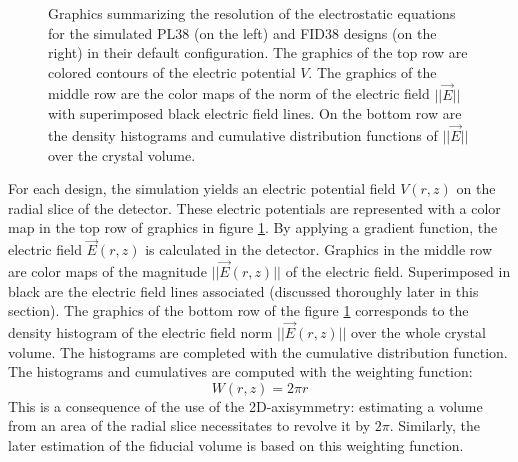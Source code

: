 \begin{figure}
\begin{minipage}{0.49\textwidth}
\end{minipage}
\caption{
Graphics summarizing the resolution of the electrostatic equations for the  simulated PL38 (on the left) and FID38 designs (on the right) in their default configuration. The graphics of the top row are colored contours of the electric potential $V$. The graphics of the middle row are the color maps of the norm of the  electric field $|| \vec{E} ||$  with superimposed black electric field lines. On the bottom row are the density histograms and cumulative distribution functions of $|| \vec{E} ||$ over the crystal volume.
}
\label{fig:pl38-fid38-steady-state}
\end{figure}

For each design, the simulation yields an electric potential field $V(r,z)$ on the radial slice of the detector. These electric potentials are represented with a color map in the top row of graphics in figure \ref{fig:pl38-fid38-steady-state}. 
By applying a gradient function, the electric field $\vec{E}(r,z)$ is calculated in the detector. Graphics in the middle row are color maps of the magnitude $||\vec{E}(r,z)||$ of the electric field. Superimposed in black are the electric field lines associated (discussed thoroughly later in this section).
The graphics of the bottom row of the figure \ref{fig:pl38-fid38-steady-state} corresponds to the density histogram of the electric field norm $||\vec{E}(r,z)||$ over the whole crystal volume. The histograms are completed with the cumulative distribution function. The histograms and cumulatives are computed with the weighting function:
\begin{equation}
\label{eq:rotation-weight}
W(r,z) = 2\pi r
\end{equation}
This is a consequence of the use of the 2D-axisymmetry: estimating a volume from an area of the radial slice necessitates to revolve it by $2\pi$. Similarly, the later estimation of the fiducial volume is based on this weighting function.

